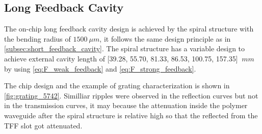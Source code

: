\begin{table}[ht]
    \centering
    \caption{My caption}
    \label{tab:chirp_6559}
\end{table}

\subsection{Long Feedback Cavity} \label{subsec:long_feedback_cavity}
The on-chip long feedback cavity design is achieved by the spiral structure with the bending radius of $1500 \ \mu m$, it follows the same design principle as in \autoref{subsec:short_feedback_cavity}. The spiral structure has a variable design to achieve external cavity length of [39.28, 55.70, 81.33, 86.53, 100.75, 157.35] $\ mm$ by using \autoref{eq:F_weak_feedback} and \autoref{eq:F_strong_feedback}.

The chip design and the example of grating characterization is shown in \autoref{fig:grating_5742}. Similliar ripples were observed in the reflection curves but not in the transmission curves, it may because the attenuation inside the polymer waveguide after the spiral structure is relative high so that the reflected from the TFF slot got attenuated.

